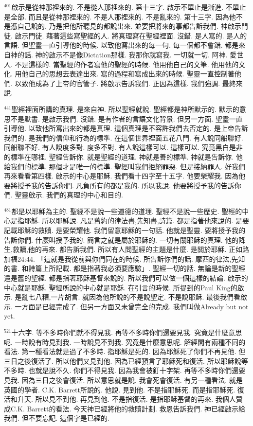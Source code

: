 \documentclass{book}
\begin{document}
$^{401}$啟示是從神那裡來的.
不是從人那裡來的.
第十三字.
啟示不單止是漸進.
不單止是全部.
而且是從神那裡來的.
不是人那裡來的.
不是亂來的.
第十三字.
因為他不是憑自己說的.
乃是把他所聽見的都說出來.
並要把將來的事都告訴我們.
神啟示門徒.
啟示門徒.
藉著這些寫聖經的人.
將真理寫在聖經裡面.
沒錯.
是人寫的.
是人的言語.
但聖靈一直引導他的時候.
以致他寫出來的每一句.
每一個都不會錯.
都是來自神的話.
神的啟示不是像Dictation那樣.
我那你就寫我.
一切就一切.
阿神.
愛世人.
不是這樣的.
當聖經的作者寫他的聖經的時候.
他用他自己的文筆.
他用他的文化.
用他自己的思想去表達出來.
寫的過程和寫成出來的時候.
聖靈一直控制著他們.
以致他成為了上帝的官管子.
將啟示告訴我們.
正因為這樣.
我們強調.
最終來說.

$^{441}$聖經裡面所講的真理.
是來自神.
所以聖經就說.
聖經都是神所默示的.
默示的意思不是默書.
是啟示我們.
沒錯.
是有作者的言語文化背景.
但另一方面.
聖靈一直引導他.
以致他所寫出來的都是真理.
這個真理是不容許我們去否定的.
是上帝告訴我們的.
是我們的信仰和行為的標準.
在這個世界裡面五花八門.
有人說同船聯好.
同船聯不好.
有人說度多對.
度多不對.
有人說這樣可以.
這樣可以.
究竟黑白是非的標準在哪裡.
聖經告訴你.
就是聖經的道理.
神就是善的標準.
神就是告訴你.
他給我們的標準.
那個才是唯一的標準.
聖經叫我們拒絕罪惡.
但是接納罪人.
好我們再來看看第四樣.
啟示的中心是耶穌.
我們看十四字至十五字.
他要榮耀我.
因為他要將授予我的告訴你們.
凡負所有的都是我的.
所以我說.
他要將授予我的告訴你們.
聖靈啟示.
我們的真理的中心和目的.

$^{481}$都是以耶穌為主的.
聖經不是說一些道德的道理.
聖經不是說一些歷史.
聖經的中心是指耶穌.
所以耶穌說.
凡是舊約的律法書,先知書,詩篇.
都是指著他來說的.
是要記載耶穌的救贖.
是要榮耀他.
我們留意耶穌的一句話.
他就是聖靈.
要將授予我的告訴你們.
什麼叫授予我的.
簡言之就是屬於耶穌的.
一切有關耶穌的真理.
他的降生,救贖,他的再來.
都告訴我們.
所以有人問聖經的主題是什麼.
是關於耶穌.
正如路加福24:44.
「這就是我從前與你們同在的時候.
所告訴你們的話.
摩西的律法,先知的書.
和詩篇上所記載.
都是指著我必須要應驗」.
聖經一切的話.
無論是新的聖經還是舊的聖經.
都是指著耶穌基督來說的.
所以我們可以做一個這樣的結論.
啟示的中心就是耶穌.
聖經所說的中心就是耶穌.
在引言的時候.
所提到的Paul King的啟示.
是亂七八糟,一片胡言.
就因為他所說的不是說聖定.
不是說耶穌.
最後我們看啟示.
一方面是已經完成了.
但另一方面又未曾完全的完成.
我們叫做Already but not yet.

$^{521}$十六字.
等不多時你們就不得見我.
再等不多時你們還要見我.
究竟是什麼意思呢.
一時說有時見到我.
一時說見不到我.
究竟是什麼意思呢.
解經間有兩種不同的看法.
第一種看法就是過了不多時.
指耶穌是死的.
因為耶穌死了你們不再見他.
但三日之後復活了.
所以他們又見到他.
因為已經預言了耶穌死和復活.
所以耶穌說等不多時.
也就是說不久.
你們不得見我.
因為我會被釘十字架.
再等不多時你們還要見我.
因為三日之後會復活.
所以意思就是說.
我會死會復活.
有另一種看法.
就是英國的學者.
C.K. Barrett所說的.
他說.
見到他.
不是指耶穌死.
而是指耶穌死.
復活和升天.
所以見不到他.
再見到他.
不是指復活.
是指耶穌基督的再來.
我個人贊成C.K. Barrett的看法.
今天神已經將他的救贖計劃.
救恩告訴我們.
神已經啟示給我們.
但不要忘記.
這個字是已經的.
\end{document}

